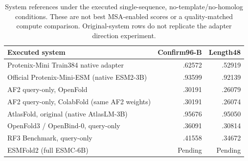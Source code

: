 \begin{table}[t]
\centering
\caption{System references under the executed single-sequence, no-template/no-homolog conditions. These are not best MSA-enabled scores or a quality-matched compute comparison. Original-system rows do not replicate the adapter direction experiment.}
\label{tab:systems}
\small
\begin{tabularx}{\linewidth}{@{}Xrr@{}}
\toprule
Executed system & Confirm96-B & Length48 \\
\midrule
Protenix-Mini Train384 native adapter & .62572 & .52919 \\
Official Protenix-Mini-ESM (native ESM2-3B) & .93599 & .92139 \\
AF2 query-only, OpenFold & .30191 & .26079 \\
AF2 query-only, ColabFold (same AF2 weights) & .30191 & .26074 \\
AtlasFold, original (native AtlasLM-3B) & .95676 & .95050 \\
OpenFold3 / OpenBind-0, query-only & .36091 & .30814 \\
RF3 Benchmark, query-only & .41558 & .34672 \\
ESMFold2 (full ESMC-6B) & Pending & Pending \\
\bottomrule
\end{tabularx}
\end{table}
